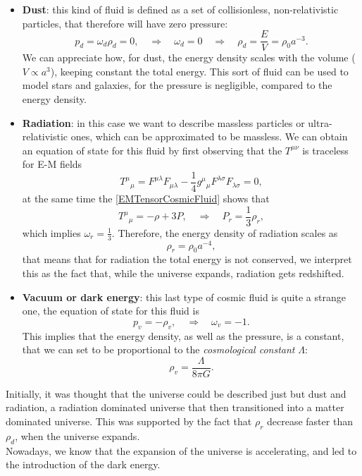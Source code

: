 \begin{itemize}
    \item \textbf{Dust}: this kind of fluid is defined as a set of collisionless, non-relativistic particles, that therefore will have zero pressure:$$p_d=\omega_d\rho_d=0,\quad\Rightarrow\quad \omega_d=0\quad\Rightarrow\quad\rho_d=\frac{E}{V}=\rho_{0}a^{-3}.$$ We can appreciate how, for dust, the energy density scales with the volume ($V \propto  a^3$), keeping constant the total energy. This sort of fluid can be used to model stars and galaxies, for the pressure is negligible, compared to the energy density.
    \item \textbf{Radiation}: in this case we want to describe massless particles or ultra-relativistic ones, which can be approximated to be massless. We can obtain an equation of state for this fluid by first observing that the $T^{\mu\nu}$ is traceless for E-M fields $$T^\mu\phantom{}_\mu=F^{\mu\lambda}F_{\mu\lambda}-\frac{1}{4}g^\mu\phantom{}_\mu F^{\lambda\sigma}F_{\lambda\sigma}=0,$$ at the same time the \eqref{EMTensorCosmicFluid} shows that $$T^\mu\phantom{}_\mu=-\rho+3P,\quad\Rightarrow\quad P_r=\frac{1}{3}\rho_r,$$ which implies $\omega_r=\frac{1}{3}$. Therefore, the energy density of radiation scales as$$\rho_r=\rho_0a^{-4},$$ that means that for radiation the total energy is not conserved, we interpret this as the fact that, while the universe expands, radiation gets redshifted.
    \item \textbf{Vacuum or dark energy}: this last type of cosmic fluid is quite a strange one, the equation of state for this fluid is $$p_v=-\rho_v,\quad \Rightarrow\quad \omega_v=-1.$$ This implies that the energy density, as well as the pressure, is a constant, that we can set to be proportional to the \emph{cosmological constant} $\Lambda$: $$\rho_v=\frac{\Lambda}{8\pi G}.$$
\end{itemize}
Initially, it was thought that the universe could be described just but dust and radiation, a radiation dominated universe that then transitioned into a matter dominated universe. This was supported by the fact that $\rho_r$ decrease faster than $\rho_d$, when the universe expands.\\ Nowadays, we know that the expansion of the universe is accelerating, and led to the introduction of the dark energy.
